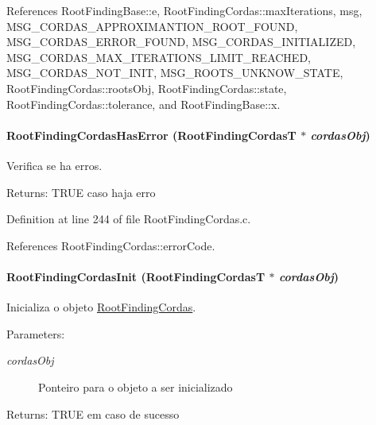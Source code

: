 References RootFindingBase::e, RootFindingCordas::maxIterations, msg, MSG\_\-CORDAS\_\-APPROXIMANTION\_\-ROOT\_\-FOUND, MSG\_\-CORDAS\_\-ERROR\_\-FOUND, MSG\_\-CORDAS\_\-INITIALIZED, MSG\_\-CORDAS\_\-MAX\_\-ITERATIONS\_\-LIMIT\_\-REACHED, MSG\_\-CORDAS\_\-NOT\_\-INIT, MSG\_\-ROOTS\_\-UNKNOW\_\-STATE, RootFindingCordas::rootsObj, RootFindingCordas::state, RootFindingCordas::tolerance, and RootFindingBase::x.\hypertarget{group____cordas_g66931e7adda820b82bb64bc671d7d550}{
\paragraph[RootFindingCordasHasError]{ RootFindingCordasHasError ({\bf RootFindingCordasT} $\ast$ {\em cordasObj})}\hfill}
\label{group____cordas_g66931e7adda820b82bb64bc671d7d550}


Verifica se ha erros. 

\begin{Desc}
\item[Returns:]TRUE caso haja erro \end{Desc}


Definition at line 244 of file RootFindingCordas.c.

References RootFindingCordas::errorCode.\hypertarget{group____cordas_g4b4d161deefaec382d2f832af2654580}{
\paragraph[RootFindingCordasInit]{ RootFindingCordasInit ({\bf RootFindingCordasT} $\ast$ {\em cordasObj})}\hfill}
\label{group____cordas_g4b4d161deefaec382d2f832af2654580}


Inicializa o objeto \hyperlink{structRootFindingCordas}{RootFindingCordas}. 

\begin{Desc}
\item[Parameters:]
\begin{description}
\item[{\em cordasObj}]Ponteiro para o objeto a ser inicializado \end{description}
\end{Desc}
\begin{Desc}
\item[Returns:]TRUE em caso de sucesso \end{Desc}


